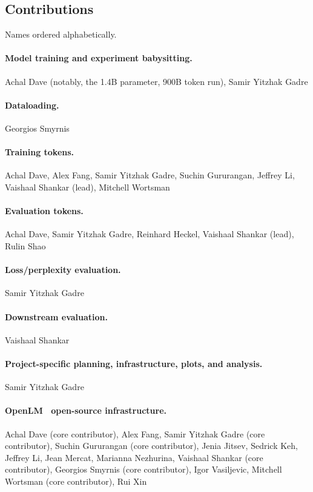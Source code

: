 
\begin{appendix}
\onecolumn

\tableofcontents
\clearpage

\section{Contributions}
Names ordered alphabetically.

\paragraph{Model training and experiment babysitting.} Achal Dave (notably, the 1.4B parameter, 900B token run),
Samir Yitzhak Gadre

\paragraph{Dataloading.}
Georgios Smyrnis

\paragraph{Training tokens.} Achal Dave, Alex Fang, Samir Yitzhak Gadre, Suchin Gururangan, Jeffrey Li, Vaishaal Shankar (lead), Mitchell Wortsman

\paragraph{Evaluation tokens.} Achal Dave, Samir Yitzhak Gadre, Reinhard Heckel, Vaishaal Shankar (lead), Rulin Shao

\paragraph{Loss/perplexity evaluation.} Samir Yitzhak Gadre
\paragraph{Downstream evaluation.} Vaishaal Shankar

\paragraph{Project-specific planning, infrastructure, plots, and analysis.}
Samir Yitzhak Gadre

\paragraph{OpenLM~\cite{open_lm} open-source infrastructure.}
Achal Dave (core contributor),
Alex Fang,
Samir Yitzhak Gadre (core contributor),
Suchin Gururangan (core contributor),
Jenia Jitsev,
Sedrick Keh,
Jeffrey Li,
Jean Mercat,
Marianna Nezhurina,
Vaishaal Shankar (core contributor),
Georgios Smyrnis (core contributor),
Igor Vasiljevic,
Mitchell Wortsman (core contributor),
Rui Xin



\end{appendix}
